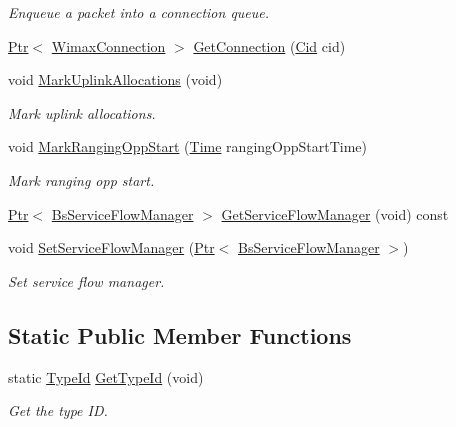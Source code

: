 \begin{DoxyCompactItemize}
\begin{DoxyCompactList}\small\item\em Enqueue a packet into a connection queue. \end{DoxyCompactList}\item 
\hyperlink{classns3_1_1Ptr}{Ptr}$<$ \hyperlink{classns3_1_1WimaxConnection}{Wimax\+Connection} $>$ \hyperlink{classns3_1_1BaseStationNetDevice_a5a4e5aa9c22b67ebd77dc61281ac8b92}{Get\+Connection} (\hyperlink{classns3_1_1Cid}{Cid} cid)
\item 
void \hyperlink{classns3_1_1BaseStationNetDevice_a21fe78ccc71b6ce89858804c6ca40d5c}{Mark\+Uplink\+Allocations} (void)
\begin{DoxyCompactList}\small\item\em Mark uplink allocations. \end{DoxyCompactList}\item 
void \hyperlink{classns3_1_1BaseStationNetDevice_a4c80a1eeb0a4c05aa87673e2eca84ec0}{Mark\+Ranging\+Opp\+Start} (\hyperlink{classns3_1_1Time}{Time} ranging\+Opp\+Start\+Time)
\begin{DoxyCompactList}\small\item\em Mark ranging opp start. \end{DoxyCompactList}\item 
\hyperlink{classns3_1_1Ptr}{Ptr}$<$ \hyperlink{classns3_1_1BsServiceFlowManager}{Bs\+Service\+Flow\+Manager} $>$ \hyperlink{classns3_1_1BaseStationNetDevice_a16a12a1027391156e044a28534c0eaf2}{Get\+Service\+Flow\+Manager} (void) const 
\item 
void \hyperlink{classns3_1_1BaseStationNetDevice_a6ffcef20111ec720cf75953387fef353}{Set\+Service\+Flow\+Manager} (\hyperlink{classns3_1_1Ptr}{Ptr}$<$ \hyperlink{classns3_1_1BsServiceFlowManager}{Bs\+Service\+Flow\+Manager} $>$)
\begin{DoxyCompactList}\small\item\em Set service flow manager. \end{DoxyCompactList}\end{DoxyCompactItemize}
\subsection*{Static Public Member Functions}
\begin{DoxyCompactItemize}
\item 
static \hyperlink{classns3_1_1TypeId}{Type\+Id} \hyperlink{classns3_1_1BaseStationNetDevice_afadce9300324077db279e7720951e571}{Get\+Type\+Id} (void)
\begin{DoxyCompactList}\small\item\em Get the type ID. \end{DoxyCompactList}\end{DoxyCompactItemize}

